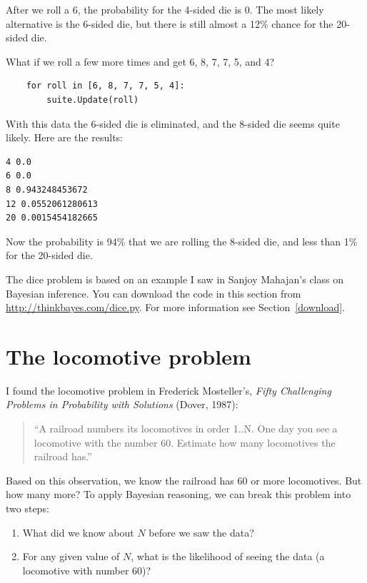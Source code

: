 \documentclass[12pt]{book}
\begin{document}
After we roll a 6, the probability for the 4-sided die is 0.  The
most likely alternative is the 6-sided die, but there is still
almost a 12\% chance for the 20-sided die.

What if we roll a few more times and get 6, 8, 7, 7, 5, and 4?

\begin{verbatim}
    for roll in [6, 8, 7, 7, 5, 4]:
        suite.Update(roll)
\end{verbatim}

With this data the 6-sided die is eliminated, and the 8-sided
die seems quite likely.  Here are the results:

\begin{verbatim}
4 0.0
6 0.0
8 0.943248453672
12 0.0552061280613
20 0.0015454182665
\end{verbatim}

Now the probability is 94\% that we are rolling the 8-sided die,
and less than 1\% for the 20-sided die.

The dice problem is based on an example I saw in Sanjoy Mahajan's class on
Bayesian inference.  You can download the code in this section from
\url{http://thinkbayes.com/dice.py}.
  For more information
see Section~\ref{download}.

\section{The locomotive problem}

I found the locomotive problem 
in Frederick Mosteller's, {\it Fifty Challenging Problems in
  Probability with Solutions} (Dover, 1987):

\begin{quote}
``A railroad numbers its locomotives in order 1..N.  One day you see a
locomotive with the number 60.  Estimate how many locomotives the
railroad has.''
\end{quote}

Based on this observation, we know the railroad has 60 or more
locomotives.  But how many more?  To apply Bayesian reasoning, we
can break this problem into two steps:

\begin{enumerate}

\item What did we know about $N$ before we saw the data?

\item For any given value of $N$, what is the likelihood of
seeing the data (a locomotive with number 60)?

\end{enumerate}
\end{document}
